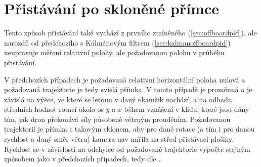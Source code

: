     \section{Přistávání po skloněné přímce} \label{sec:offboardpidangle}
        Tento způsob přistávání také vychází z prvního zmíněného (\cref{sec:offboardpid}), ale narozdíl od předchozího s Kálmánovým filtrem (\cref{sec:kalmanoffboardpid}) neupravuje měření relativní polohy, ale požadovanou polohu v průběhu přistávání.
        
        V předchozích případech je požadovaná relativní horizontální poloha nulová a požadovaná trajektorie je tedy svislá přímka. V tomto případě je proměnná a je závislá na výšce, ve které se letoun v daný okamžik nachází, a na odhadu středních hodnot rotací okolo os $y$ a $x$ během vznášení v klidu, které jsou dány tím, jak dron překonává síly působené větrným prouděním. Požadovanou trajektorií je přímka s takovým sklonem, aby pro dané rotace (a tím i pro danou rychlost a daný směr větru) kamera \acrshort{uav} mířila na střed přistávací plošiny. Rychlost se v závislosti na odchylce od požadované trajektorie vypočte stejným způsobem jako v předchozích případech, tedy dle .


